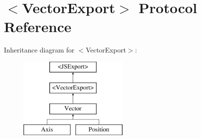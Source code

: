 \hypertarget{protocol_vector_export-p}{}\section{$<$Vector\+Export$>$ Protocol Reference}
\label{protocol_vector_export-p}
Inheritance diagram for $<$Vector\+Export$>$\+:\begin{figure}[H]
\begin{center}
\leavevmode
\includegraphics[height=4.000000cm]{protocol_vector_export-p}
\end{center}
\end{figure}
